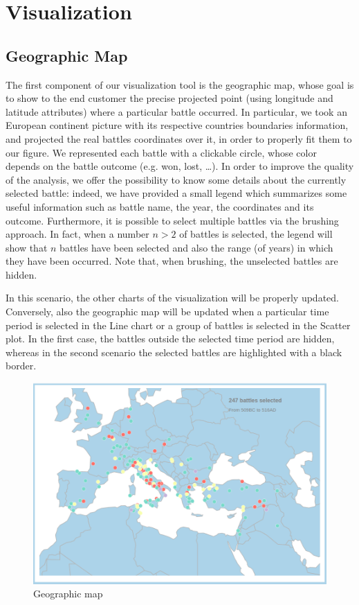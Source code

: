 \section{Visualization}
\subsection{Geographic Map}
The first component of our visualization tool is the geographic map, whose goal is to show to the end customer the precise projected point (using longitude and latitude attributes) where a particular battle occurred. In particular, we took an European continent picture with its respective countries boundaries information, and projected the real battles coordinates over it, in order to properly fit them to our figure. We represented each battle with a clickable circle, whose color depends on the battle outcome (e.g. won, lost, \dots). In order to improve the quality of the analysis, we offer the possibility to know some details about the currently selected battle: indeed, we have provided a small legend which summarizes some useful information such as battle name, the year, the coordinates and its outcome. Furthermore, it is possible to select multiple battles via the brushing approach. In fact, when a number $n > 2$ of battles is selected, the legend will show that $n$ battles have been selected and also the range (of years) in which they have been occurred. Note that, when brushing, the unselected battles are hidden.

In this scenario, the other charts of the visualization will be properly updated. Conversely, also the geographic map will be updated when a particular time period is selected in the Line chart or a group of battles is selected in the Scatter plot. In the first case, the battles outside the selected time period are hidden, whereas in the second scenario the selected battles are highlighted with a black border.
\begin{figure}[h]
\centering
\includegraphics[scale=0.20]{./images/geographic_map.png}
\caption{Geographic map}
\end{figure}

